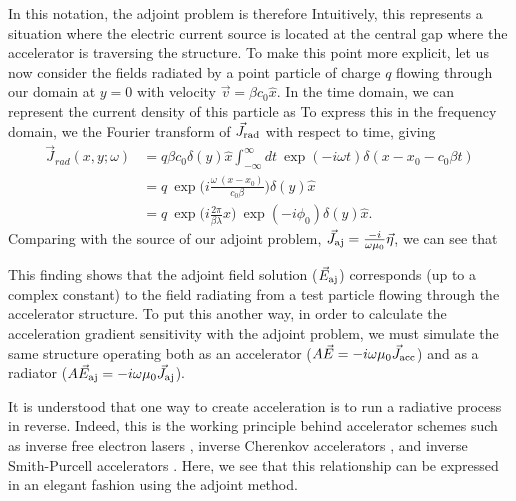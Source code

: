 In this notation, the adjoint problem is therefore
%
%
Intuitively, this represents a situation where the electric current source is located at the central gap where the accelerator is traversing the structure.
To make this point more explicit, let us now consider the fields radiated by a point particle of charge $q$ flowing through our domain at $y = 0$ with velocity $\vec{v} = \beta c_0 \hat{x}$.
In the time domain, we can represent the current density of this particle as
%
%
To express this in the frequency domain, we the Fourier transform of $\vec{J}_\textrm{rad}$ with respect to time, giving
%
\begin{align}
    \vec{J}_{rad}(x,y;\omega) &= q \beta c_0 \delta(y)\hat{x}\int _{-\infty}^{\infty}{dt\ }\exp(-i\omega t)\delta(x-x_0-c_0\beta t)\\
    &= q\ \exp\Big(i\frac{\omega\ (x-x_0)}{c_0 \beta}\Big)\delta(y)\hat{x}\\
    &= q\ \exp\Big(i\frac{2\pi}{ \beta\lambda}x\Big)\ \exp(-i\phi_0)\delta(y)\hat{x}.
\label{eq:point-current}
\end{align}
%
Comparing with the source of our adjoint problem, $\vec{J}_{\textrm{aj}} = \frac{-i}{\omega\mu_0}\vec{\eta}$, we can see that 
%

This finding shows that the adjoint field solution ($\vec{E}_{\textrm{aj}}$) corresponds (up to a complex constant) to the field radiating from a test particle flowing through the accelerator structure.
To put this another way, in order to calculate the acceleration gradient sensitivity with the adjoint problem, we must simulate the same structure operating both as an accelerator ($A\vec{E}=-i\omega\mu_0\vec{J}_\textrm{acc}$) and as a radiator ($A\vec{E}_{\textrm{aj}}=-i\omega\mu_0\vec{J}_{\textrm{aj}}$).

It is understood that one way to create acceleration is to run a radiative process in reverse.
Indeed, this is the working principle behind accelerator schemes such as inverse free electron lasers \cite{musumeci2005high, courant1985high}, inverse Cherenkov accelerators \cite{kimura1995laser, fontana1983high}, and inverse Smith-Purcell accelerators \cite{bae1992experimental, mizuno1987experimental}.
Here, we see that this relationship can be expressed in an elegant fashion using the adjoint method.

